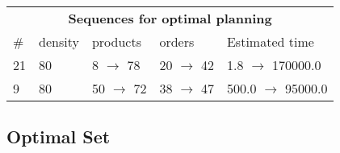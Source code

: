 \documentclass{article}
\begin{document}
                            \begin{center}
                            \begin{tabular}{@{}l|l|l|l|l@{}}
                            \multicolumn{5}{c}{\bf \large Sequences for optimal planning}\\
                            \# & density & products & orders & Estimated time\\\midrule
                            21&80&8 $\rightarrow$ 78&20 $\rightarrow$ 42&1.8 $\rightarrow$ 170000.0\\
9&80&50 $\rightarrow$ 72&38 $\rightarrow$ 47&500.0 $\rightarrow$ 95000.0
                            \end{tabular}
                            \end{center}
                    
                                \subsection*{Optimal Set}
                                
\end{document}
